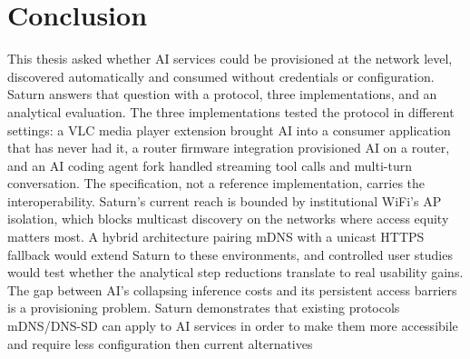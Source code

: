 \chapter{Conclusion}
\label{ch:conclusion}

This thesis asked whether AI services could be provisioned at the network level, discovered automatically and consumed without credentials or configuration. Saturn answers that question with a protocol, three implementations, and an analytical evaluation. The three implementations tested the protocol in different settings: a VLC media player extension brought AI into a consumer application that has never had it, a router firmware integration provisioned AI on a router, and an AI coding agent fork handled streaming tool calls and multi-turn conversation. The specification, not a reference implementation, carries the interoperability. Saturn's current reach is bounded by institutional WiFi's AP isolation, which blocks multicast discovery on the networks where access equity matters most. A hybrid architecture pairing mDNS with a unicast HTTPS fallback would extend Saturn to these environments, and controlled user studies would test whether the analytical step reductions translate to real usability gains. The gap between AI's collapsing inference costs and its persistent access barriers is a provisioning problem. Saturn demonstrates that existing protocols mDNS/DNS-SD can apply to AI services in order to make them more accessibile and require less configuration then current alternatives

